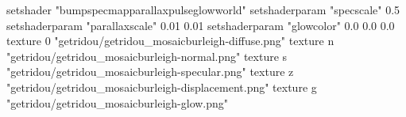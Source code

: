 setshader "bumpspecmapparallaxpulseglowworld"
setshaderparam "specscale" 0.5
setshaderparam "parallaxscale" 0.01 0.01
setshaderparam "glowcolor" 0.0 0.0 0.0
texture 0 "getridou/getridou_mosaicburleigh-diffuse.png"
texture n "getridou/getridou_mosaicburleigh-normal.png"
texture s "getridou/getridou_mosaicburleigh-specular.png"
texture z "getridou/getridou_mosaicburleigh-displacement.png"
texture g "getridou/getridou_mosaicburleigh-glow.png"
